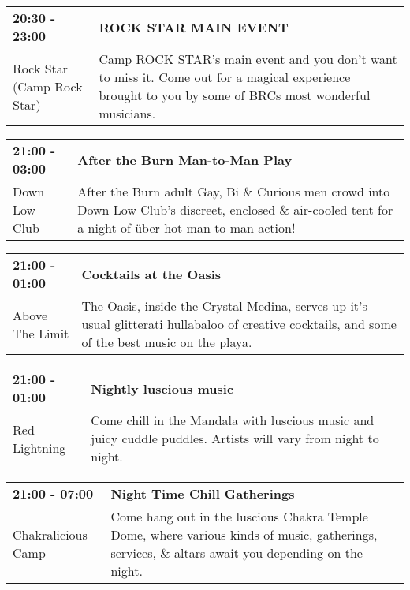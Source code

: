 \begin{tabular}{ p{1in} p{2.2in} }
    \textbf{20:30 - 23:00} & \textbf{ROCK STAR MAIN EVENT} \\
    Rock Star (Camp Rock Star) \newline  & Camp ROCK STAR's main event and you don't want to miss it. Come out for a magical experience brought to you by some of BRCs most wonderful musicians. \\
    \hline 
\end{tabular}
    
\begin{tabular}{ p{1in} p{2.2in} }
    \textbf{21:00 - 03:00} & \textbf{After the Burn Man-to-Man Play} \\
    Down Low Club \newline  & After the Burn adult Gay, Bi \& Curious men crowd into Down Low Club's discreet, enclosed \& air-cooled tent for a night of \"uber hot man-to-man action! \\
    \hline 
\end{tabular}
    
\begin{tabular}{ p{1in} p{2.2in} }
    \textbf{21:00 - 01:00} & \textbf{Cocktails at the Oasis} \\
    Above The Limit \newline  & The Oasis, inside the Crystal Medina, serves up it's usual glitterati hullabaloo of creative cocktails, and some of the best music on the playa. \\
    \hline 
\end{tabular}
    
\begin{tabular}{ p{1in} p{2.2in} }
    \textbf{21:00 - 01:00} & \textbf{Nightly luscious music} \\
    Red Lightning \newline  & Come chill in the Mandala with luscious music and juicy cuddle puddles. Artists will vary from night to night. \\
    \hline 
\end{tabular}
    
\begin{tabular}{ p{1in} p{2.2in} }
    \textbf{21:00 - 07:00} & \textbf{Night Time Chill Gatherings} \\
    Chakralicious Camp \newline  & Come hang out in the luscious Chakra Temple Dome, where various kinds of music, gatherings, services, \& altars await you depending on the night. \\
    \hline 
\end{tabular}
    
